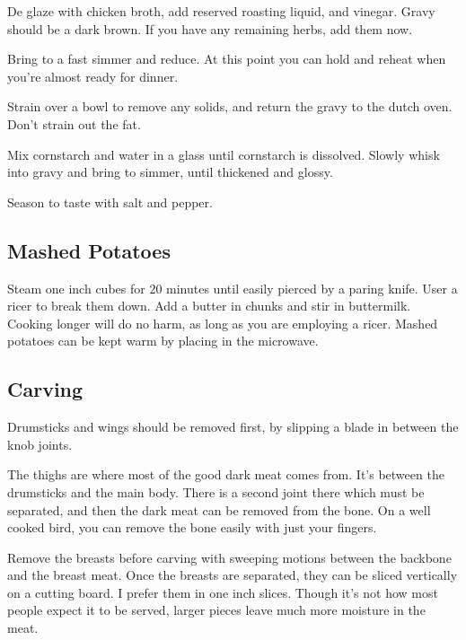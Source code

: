 \begin{recipe}
De glaze with chicken broth, add reserved roasting liquid, and vinegar. Gravy should be a dark brown. If you have any remaining herbs, add them now.

Bring to a fast simmer and reduce. At this point you can hold and reheat when you're almost ready for dinner.

Strain over a bowl to remove any solids, and return the gravy to the dutch oven. Don't strain out the fat. 


Mix cornstarch and water in a glass until cornstarch is dissolved. Slowly whisk into gravy and bring to simmer, until thickened and glossy. 

Season to taste with salt and pepper.

\subsection{Mashed Potatoes}



Steam one inch cubes for 20 minutes until easily pierced by a paring knife. User a ricer to break them down. Add a butter in chunks and stir in buttermilk. Cooking longer will do no harm, as long as you are employing a ricer. Mashed potatoes can be kept warm by placing in the microwave. 

\newpage
\subsection{Carving}

Drumsticks and wings should be removed first, by slipping a blade in between the knob joints.

The thighs are where most of the good dark meat comes from. It's between the drumsticks and the main body. There is a second joint there which must be separated, and then the dark meat can be removed from the bone. On a well cooked bird, you can remove the bone easily with just your fingers.

Remove the breasts before carving with sweeping motions between the backbone and the breast meat.
Once the breasts are separated, they can be sliced vertically on a cutting board.
I prefer them in one inch slices.
Though it's not how most people expect it to be served, larger pieces leave much more moisture in the meat.

\end{recipe}
